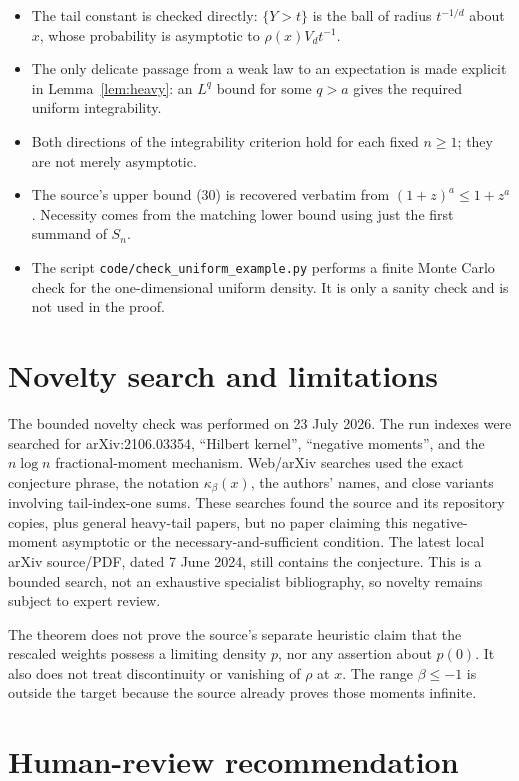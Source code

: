 \documentclass[11pt]{article}
\begin{document}
\begin{itemize}
\item The tail constant is checked directly:
$\{Y>t\}$ is the ball of radius $t^{-1/d}$ about $x$, whose probability is
asymptotic to $\rho(x)V_dt^{-1}$.
\item The only delicate passage from a weak law to an expectation is made
explicit in Lemma~\ref{lem:heavy}: an $L^q$ bound for some $q>a$ gives the
required uniform integrability.
\item Both directions of the integrability criterion hold for each fixed
$n\geq1$; they are not merely asymptotic.
\item The source's upper bound (30) is recovered verbatim from
$(1+z)^a\leq1+z^a$.  Necessity comes from the matching lower bound using
just the first summand of $S_n$.
\item The script \texttt{code/check\_uniform\_example.py} performs a finite
Monte Carlo check for the one-dimensional uniform density.  It is only a
sanity check and is not used in the proof.
\end{itemize}

\section{Novelty search and limitations}

The bounded novelty check was performed on 23 July 2026.  The run indexes
were searched for arXiv:2106.03354, ``Hilbert kernel'', ``negative
moments'', and the $n\log n$ fractional-moment mechanism.  Web/arXiv
searches used the exact conjecture phrase, the notation
$\kappa_\beta(x)$, the authors' names, and close variants involving
tail-index-one sums.  These searches found the source and its repository
copies, plus general heavy-tail papers, but no paper claiming this
negative-moment asymptotic or the necessary-and-sufficient condition.
The latest local arXiv source/PDF, dated 7 June 2024, still contains the
conjecture.  This is a bounded search, not an exhaustive specialist
bibliography, so novelty remains subject to expert review.

The theorem does not prove the source's separate heuristic claim that the
rescaled weights possess a limiting density $p$, nor any assertion about
$p(0)$.  It also does not treat discontinuity or vanishing of $\rho$ at
$x$.  The range $\beta\leq-1$ is outside the target because the source
already proves those moments infinite.

\section{Human-review recommendation}
\end{document}
